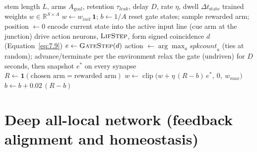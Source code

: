 \begin{algorithm}[htbp!]
\caption{Sequential trajectory credit assignment on the T-maze (one seed).}
\label{alg:maze}
\begin{algorithmic}[1]
\Require stem length $L$, arms $A_{\text{goal}}$, retention $\tau_{leak}$, delay $D$, rate $\eta$, dwell $\Delta t_{\text{state}}$
\Ensure trained weights $w \in \mathbb{R}^{S\times A}$
\State $w \gets w_{init}\,\mathbf{1}$; \quad $b \gets 1/A$
    \State reset gate states; \quad sample rewarded arm; \quad position $\gets 0$
        \State encode current state into the active input line (cue arm at the junction)
            \State drive action neurons, $\textsc{LifStep}$, form signed coincidence $d$ (Equation~\ref{eq:7.9})
            \State $e \gets \textsc{GateStep}(d)$ 
        \EndFor
        \State action $\gets \arg\max_a \textit{spkcount}_a$ (ties at random); advance/terminate per the environment
    \EndWhile
    \State relax the gate (undriven) for $D$ seconds, then snapshot $e^{\ast}$ on every synapse
    \State $R \gets \mathbf{1}(\text{chosen arm} = \text{rewarded arm})$
    \State $w \gets \operatorname{clip}\!\big(w + \eta\,(R-b)\,e^{\ast},\ 0,\ w_{max}\big)$ 
    \State $b \gets b + 0.02\,(R-b)$
\EndFor
\end{algorithmic}
\end{algorithm}

\section{Deep all-local network (feedback alignment and homeostasis)}
\label{app:alg-deep}

